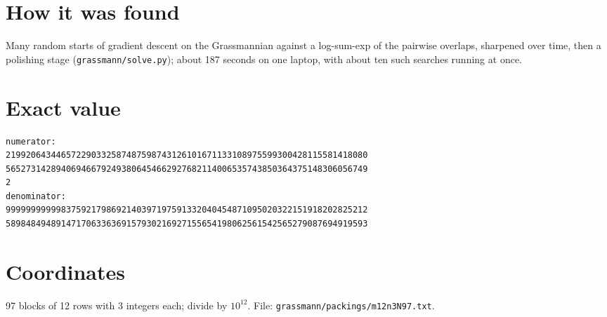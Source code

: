 \documentclass[11pt,a4paper]{article}
\begin{document}
\section{How it was found}
Many random starts of gradient descent on the Grassmannian against a log-sum-exp of the pairwise overlaps, sharpened over time, then a polishing stage (\texttt{grassmann/solve.py}); about 187 seconds on one laptop, with about ten such searches running at once.


\appendix
\section{Exact value}
{\small
\begin{verbatim}
numerator:
219920643446572290332587487598743126101671133108975599300428115581418080
565273142894069466792493806454662927682114006535743850364375148306056749
2
denominator:
999999999998375921798692140397197591332040454871095020322151918202825212
589848494891471706336369157930216927155654198062561542565279087694919593
\end{verbatim}}

\section{Coordinates}
97 blocks of 12 rows with 3 integers each; divide by $10^{12}$. File: \texttt{grassmann/packings/m12n3N97.txt}.
{\tiny
\begin{multicols}{3}
\end{multicols}}
\end{document}

